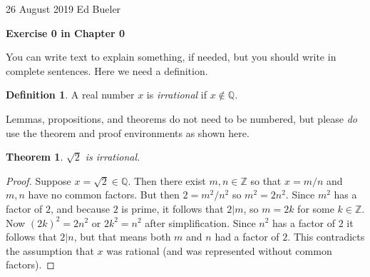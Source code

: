 \documentclass[12pt]{amsart}
\theoremstyle{definition}
\newtheorem*{defn}{Definition}
\theoremstyle{plain}
\newtheorem*{thm}{Theorem}
\theoremstyle{remark}
\newcommand{\QQ}{\mathbb{Q}}
\newcommand{\ZZ}{\mathbb{Z}}
\begin{document}
\noindent \footnotesize 26 August 2019  %
\normalsize \hfill Ed Bueler  %


\thispagestyle{empty}  %

\bigskip

\Large\centerline{\textbf{Exercise 0 in Chapter 0}}  %
\normalsize


\bigskip
You can write text to explain something, if needed, but you should write in complete sentences.  Here we need a definition.

\begin{defn} A real number $x$ is \emph{irrational} if $x\notin \QQ$.
\end{defn}

Lemmas, propositions, and theorems do not need to be numbered, but please \emph{do} use the theorem and proof environments as shown here.

\begin{thm} $\sqrt{2}$ is irrational.
\end{thm}

\begin{proof} Suppose $x=\sqrt{2} \in \QQ$.  Then there exist $m,n\in\ZZ$ so that $x=m/n$ and $m,n$ have no common factors.  But then $2=m^2/n^2$ so $m^2=2n^2$.  Since $m^2$ has a factor of $2$, and because $2$ is prime, it follows that $2|m$, so $m=2k$ for some $k\in\ZZ$.  Now $(2k)^2=2n^2$ or $2k^2=n^2$ after simplification.  Since $n^2$ has a factor of $2$ it follows that $2|n$, but that means both $m$ and $n$ had a factor of $2$.  This contradicts the assumption that $x$ was rational (and was represented without common factors).
\end{proof}

\end{document}

